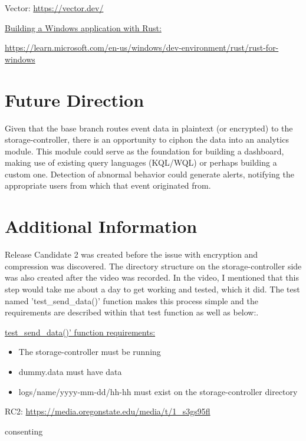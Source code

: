 \documentclass{article}
\begin{document}
Vector: \url{https://vector.dev/}\vspace{0.25cm}

\underline{Building a Windows application with Rust:}\vspace{0.25cm}

\url{https://learn.microsoft.com/en-us/windows/dev-environment/rust/rust-for-windows}

\newpage

\section{Future Direction}

Given that the base branch routes event data in plaintext (or encrypted) to the storage-controller, there is an opportunity to ciphon the data into an analytics module. This module could serve as the foundation for building a dashboard, making use of existing query languages (KQL/WQL) or perhaps building a custom one. Detection of abnormal behavior could generate alerts, notifying the appropriate users from which that event originated from.


\section{Additional Information}

Release Candidate 2 was created before the issue with encryption and compression was discovered. The directory structure on the storage-controller side was also created after the video was recorded. In the video, I mentioned that this step would take me about a day to get working and tested, which it did. The test named 'test\_send\_data()' function makes this process simple and the requirements are described within that test function as well as below:.\vspace{0.25cm}

\underline{test\_send\_data()' function requirements:}
\begin{itemize}
    \item{The storage-controller must be running}
    \item{dummy.data must have data}
    \item{logs/name/yyyy-mm-dd/hh-hh must exist on the storage-controller directory}
\end{itemize}


RC2: \url{https://media.oregonstate.edu/media/t/1\_s3gs95fl}

consenting
\end{document}
